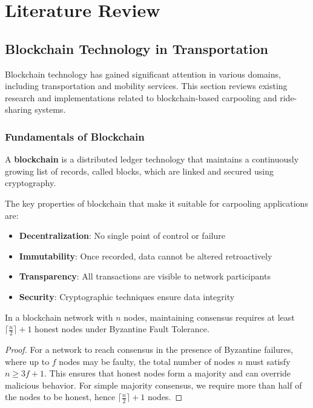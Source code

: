\chapter{Literature Review}

\section{Blockchain Technology in Transportation}

Blockchain technology has gained significant attention in various domains, including transportation and mobility services. This section reviews existing research and implementations related to blockchain-based carpooling and ride-sharing systems.

\subsection{Fundamentals of Blockchain}

\begin{definition}
A \textbf{blockchain} is a distributed ledger technology that maintains a continuously growing list of records, called blocks, which are linked and secured using cryptography.
\end{definition}

The key properties of blockchain that make it suitable for carpooling applications are:

\begin{itemize}
    \item \textbf{Decentralization}: No single point of control or failure
    \item \textbf{Immutability}: Once recorded, data cannot be altered retroactively
    \item \textbf{Transparency}: All transactions are visible to network participants
    \item \textbf{Security}: Cryptographic techniques ensure data integrity
\end{itemize}

\begin{theorem}
In a blockchain network with $n$ nodes, maintaining consensus requires at least $\lceil \frac{n}{2} \rceil + 1$ honest nodes under Byzantine Fault Tolerance.
\end{theorem}

\begin{proof}
For a network to reach consensus in the presence of Byzantine failures, where up to $f$ nodes may be faulty, the total number of nodes $n$ must satisfy $n \geq 3f + 1$. This ensures that honest nodes form a majority and can override malicious behavior. For simple majority consensus, we require more than half of the nodes to be honest, hence $\lceil \frac{n}{2} \rceil + 1$ nodes.
\end{proof}

